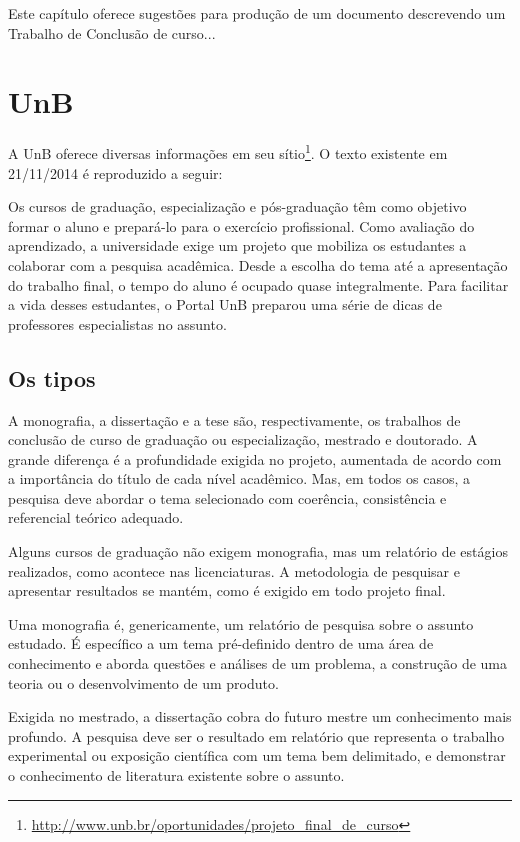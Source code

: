 Este capítulo oferece sugestões para produção de um documento descrevendo um Trabalho de Conclusão de curso...

\section{UnB}%
A UnB oferece diversas informações em seu sítio\footnote{\url{http://www.unb.br/oportunidades/projeto_final_de_curso}}. O texto existente em 21/11/2014 é 
reproduzido a seguir:

\selectfont%
Os cursos de graduação, especialização e pós-graduação têm como objetivo formar o aluno e prepará-lo para o exercício profissional. Como avaliação do aprendizado, a universidade exige um projeto que mobiliza os estudantes a colaborar com a pesquisa acadêmica. Desde a escolha do tema até a apresentação do trabalho final, o tempo do aluno é ocupado quase integralmente. Para facilitar a vida desses estudantes, o Portal UnB preparou uma série de dicas de professores especialistas no assunto.

\subsection{Os tipos}
A monografia, a dissertação e a tese são, respectivamente, os trabalhos de conclusão de curso de graduação ou especialização, mestrado e doutorado. A grande diferença é a profundidade exigida no projeto, aumentada de acordo com a importância do título de cada nível acadêmico. Mas, em todos os casos, a pesquisa deve abordar o tema selecionado com coerência, consistência e referencial teórico adequado.

Alguns cursos de graduação não exigem monografia, mas um relatório de estágios realizados, como acontece nas licenciaturas. A metodologia de pesquisar e apresentar resultados se mantém, como é exigido em todo projeto final.

Uma monografia é, genericamente, um relatório de pesquisa sobre o assunto estudado. É específico a um tema pré-definido dentro de uma área de conhecimento e aborda questões e análises de um problema, a construção de uma teoria ou o desenvolvimento de um produto.

Exigida no mestrado, a dissertação cobra do futuro mestre um conhecimento mais profundo. A pesquisa deve ser o resultado em relatório que representa o trabalho experimental ou exposição científica com um tema bem delimitado, e demonstrar o conhecimento de literatura existente sobre o assunto.


